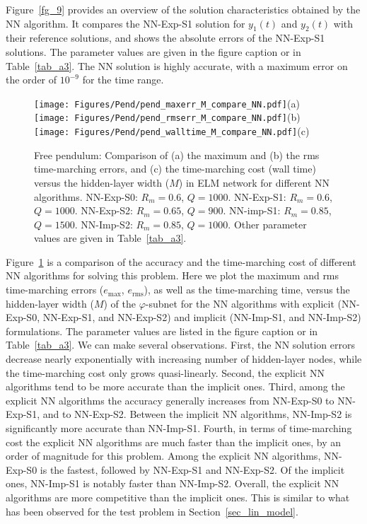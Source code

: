 Figure~\ref{fg_9} provides 
an overview of the solution characteristics obtained by the NN algorithm.
It compares the NN-Exp-S1 solution for $y_1(t)$ and $y_2(t)$
with their reference solutions, and shows the absolute errors of the
NN-Exp-S1 solutions. The parameter values are given in
the figure caption or in Table~\ref{tab_a3}.
The NN solution is highly accurate, with a maximum error on the order of $10^{-9}$
for the time range.



\begin{figure}
  \centerline{
    \texttt{[image: Figures/Pend/pend\_maxerr\_M\_compare\_NN.pdf]}(a)
    \texttt{[image: Figures/Pend/pend\_rmserr\_M\_compare\_NN.pdf]}(b)
    \texttt{[image: Figures/Pend/pend\_walltime\_M\_compare\_NN.pdf]}(c)
  }
  \caption{Free pendulum: Comparison of (a) the maximum and (b) the rms time-marching errors,
    and (c) the time-marching cost (wall time) versus the hidden-layer width ($M$)
    in ELM network for different NN algorithms.
    NN-Exp-S0: $R_m=0.6$, $Q=1000$.
    NN-Exp-S1: $R_m=0.6$, $Q=1000$.
    NN-Exp-S2: $R_m=0.65$, $Q=900$.
    NN-imp-S1: $R_m=0.85$, $Q=1500$.
    NN-Imp-S2: $R_m=0.85$, $Q=1000$.
    Other parameter values are given in Table~\ref{tab_a3}.
  }
  \label{fg_10}
\end{figure}


Figure~\ref{fg_10} is a comparison of the accuracy and the time-marching cost
of different NN algorithms for solving this problem. 
Here we plot the maximum and rms time-marching errors ($e_{\max}$, $e_{\text{rms}}$),
as well as the time-marching time,
versus the hidden-layer width ($M$) of the $\varphi$-subnet for
the NN algorithms with explicit (NN-Exp-S0, NN-Exp-S1, and NN-Exp-S2) and
implicit (NN-Imp-S1, and NN-Imp-S2) formulations.
The parameter values are listed in the figure caption or in Table~\ref{tab_a3}.
We can make several observations.
First, the NN solution errors decrease nearly exponentially
with increasing number of hidden-layer nodes, while the time-marching
cost only grows quasi-linearly.
Second, the explicit NN algorithms tend to be more accurate than the implicit ones.
Third, among the explicit NN algorithms the accuracy generally increases
from NN-Exp-S0 to NN-Exp-S1, and to NN-Exp-S2. Between the implicit
NN algorithms, NN-Imp-S2 is significantly more accurate than NN-Imp-S1.
Fourth, in terms of time-marching cost the explicit NN algorithms
are much faster than the implicit ones, by an order of magnitude
for this problem.
Among the explicit NN algorithms, NN-Exp-S0 is the fastest, followed by NN-Exp-S1 and
NN-Exp-S2. Of the implicit ones, NN-Imp-S1 is notably faster than NN-Imp-S2.
Overall, the explicit NN algorithms are more competitive than the implicit ones.
This is similar to what has been observed for the test problem in Section~\ref{sec_lin_model}.


